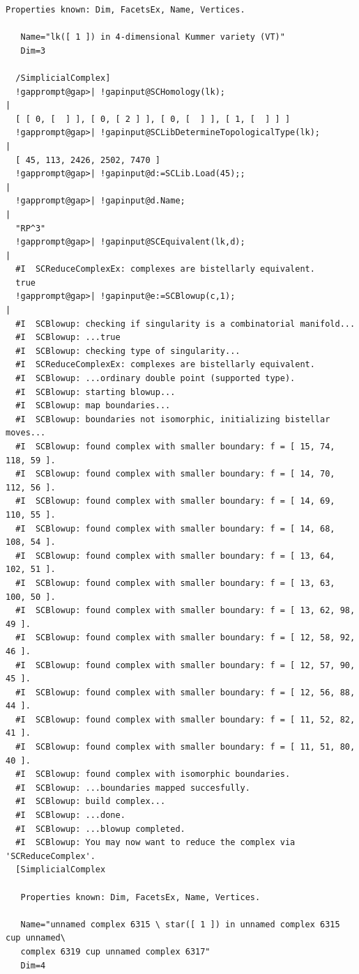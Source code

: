 \documentclass[a4paper,11pt]{report}
\begin{document}
{{\begin{Verbatim}[commandchars=!@|,fontsize=\small,frame=single,label=Example]
   Properties known: Dim, FacetsEx, Name, Vertices.
  
   Name="lk([ 1 ]) in 4-dimensional Kummer variety (VT)"
   Dim=3
  
  /SimplicialComplex]
  !gapprompt@gap>| !gapinput@SCHomology(lk);
|
  [ [ 0, [  ] ], [ 0, [ 2 ] ], [ 0, [  ] ], [ 1, [  ] ] ]
  !gapprompt@gap>| !gapinput@SCLibDetermineTopologicalType(lk);
|
  [ 45, 113, 2426, 2502, 7470 ]
  !gapprompt@gap>| !gapinput@d:=SCLib.Load(45);;
|
  !gapprompt@gap>| !gapinput@d.Name;
|
  "RP^3"
  !gapprompt@gap>| !gapinput@SCEquivalent(lk,d);
|
  #I  SCReduceComplexEx: complexes are bistellarly equivalent.
  true
  !gapprompt@gap>| !gapinput@e:=SCBlowup(c,1);
|
  #I  SCBlowup: checking if singularity is a combinatorial manifold...
  #I  SCBlowup: ...true
  #I  SCBlowup: checking type of singularity...
  #I  SCReduceComplexEx: complexes are bistellarly equivalent.
  #I  SCBlowup: ...ordinary double point (supported type).
  #I  SCBlowup: starting blowup...
  #I  SCBlowup: map boundaries...
  #I  SCBlowup: boundaries not isomorphic, initializing bistellar moves...
  #I  SCBlowup: found complex with smaller boundary: f = [ 15, 74, 118, 59 ].
  #I  SCBlowup: found complex with smaller boundary: f = [ 14, 70, 112, 56 ].
  #I  SCBlowup: found complex with smaller boundary: f = [ 14, 69, 110, 55 ].
  #I  SCBlowup: found complex with smaller boundary: f = [ 14, 68, 108, 54 ].
  #I  SCBlowup: found complex with smaller boundary: f = [ 13, 64, 102, 51 ].
  #I  SCBlowup: found complex with smaller boundary: f = [ 13, 63, 100, 50 ].
  #I  SCBlowup: found complex with smaller boundary: f = [ 13, 62, 98, 49 ].
  #I  SCBlowup: found complex with smaller boundary: f = [ 12, 58, 92, 46 ].
  #I  SCBlowup: found complex with smaller boundary: f = [ 12, 57, 90, 45 ].
  #I  SCBlowup: found complex with smaller boundary: f = [ 12, 56, 88, 44 ].
  #I  SCBlowup: found complex with smaller boundary: f = [ 11, 52, 82, 41 ].
  #I  SCBlowup: found complex with smaller boundary: f = [ 11, 51, 80, 40 ].
  #I  SCBlowup: found complex with isomorphic boundaries.
  #I  SCBlowup: ...boundaries mapped succesfully.
  #I  SCBlowup: build complex...
  #I  SCBlowup: ...done.
  #I  SCBlowup: ...blowup completed.
  #I  SCBlowup: You may now want to reduce the complex via 'SCReduceComplex'.
  [SimplicialComplex
  
   Properties known: Dim, FacetsEx, Name, Vertices.
  
   Name="unnamed complex 6315 \ star([ 1 ]) in unnamed complex 6315 cup unnamed\
   complex 6319 cup unnamed complex 6317"
   Dim=4
  

\end{Verbatim}}}
\end{document}
